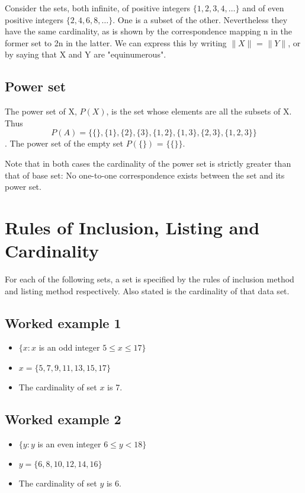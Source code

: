 \documentclass[]{report}
\begin{document}
Consider the sets, both infinite, of positive integers $\{1,2,3,4, \ldots\}$ and of even positive integers $\{2,4,6,8, \ldots\}$. One is a subset of the other. Nevertheless they have the same cardinality, as is shown by the correspondence mapping n in the former set to 2n in the latter. We can express this by writing $\|X\|$ = $\|Y\|$, or by saying that X and Y are "equinumerous".

\subsection{Power set}

The power set of X, $P(X)$, is the set whose elements are all the subsets of X. Thus \[P(A) = \{ \{\}, \{1\}, \{2\}, \{3\}, \{1,2\}, \{1,3\}, \{2,3\}, \{1,2,3\}\}\]. The power set of the empty set $P(\{\})$ = $\{\{\}\}$. 

Note that in both cases the cardinality of the power set is strictly greater than that of base set: No one-to-one correspondence exists between the set and its power set. 



\section*{Rules of Inclusion, Listing and Cardinality}
For each of the following sets, a set is specified by the rules of inclusion method and listing method respectively. Also stated is the cardinality of that data set.
\subsection*{Worked example 1}
\begin{itemize}
	\item $\{ x : x $ is an odd integer $ 5 \leq x \leq 17 \}$
	\item $x = \{5,7,9,11,13,15,17\}$
	\item The cardinality of set $x$ is 7.
\end{itemize}

\subsection*{Worked example 2}
\begin{itemize}
	\item $\{ y : y $ is an even integer $ 6 \leq y < 18 \}$
	\item $y = \{6,8,10,12,14,16\}$
	\item The cardinality of set $y$ is 6.
\end{itemize}
\end{document}
